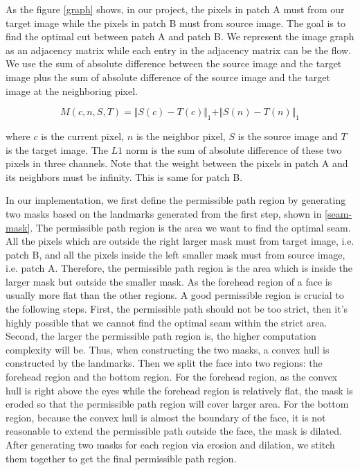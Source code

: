 \documentclass[10pt,twocolumn,letterpaper]{article}
\begin{document}
As the figure \ref{graph} shows, in our project, the pixels in patch A must from our target image while the pixels in patch B must from source image. The goal is to find the optimal cut between patch A and patch B. We represent the image graph as an adjacency matrix while each entry in the adjacency matrix can be the flow. We use the sum of absolute difference between the source image and the target image plus the sum of absolute difference of the source image and the target image at the neighboring pixel.

\begin{equation}
M(c,n,S,T) = \Vert S(c) - T(c) \Vert_1 + \Vert S(n) - T(n) \Vert_1
\end{equation}

where $c$ is the current pixel, $n$ is the neighbor pixel, $S$ is the source image and $T$ is the target image. The $L1$ norm is the sum of absolute difference of these two pixels in three channels. Note that the weight between the pixels in patch A and its neighbors must be infinity. This is same for patch B.

In our implementation, we first define the permissible path region by generating two masks based on the landmarks generated from the first step, shown in \ref{seam-mask}. The permissible path region is the area we want to find the optimal seam. All the pixels which are outside the right larger mask must from target image, i.e. patch B, and all the pixels inside the left smaller mask must from source image, i.e. patch A. Therefore, the permissible path region is the area which is inside the larger mask but outside the smaller mask. As the forehead region of a face is usually more flat than the other regions. A good permissible region is crucial to the following steps. First, the permissible path should not be too strict, then it's highly possible that we cannot find the optimal seam within the strict area. Second, the larger the permissible path region is, the higher computation complexity will be. Thus, when constructing the two masks, a convex hull is constructed by the landmarks. Then we split the face into two regions: the forehead region and the bottom region. For the forehead region, as the convex hull is right above the eyes while the forehead region is relatively flat, the mask is eroded so that the permissible path region will cover larger area. For the bottom region, because the convex hull is almost the boundary of the face, it is not reasonable to extend the permissible path outside the face, the mask is dilated. After generating two masks for each region via erosion and dilation, we stitch them together to get the final permissible path region.
\end{document}
